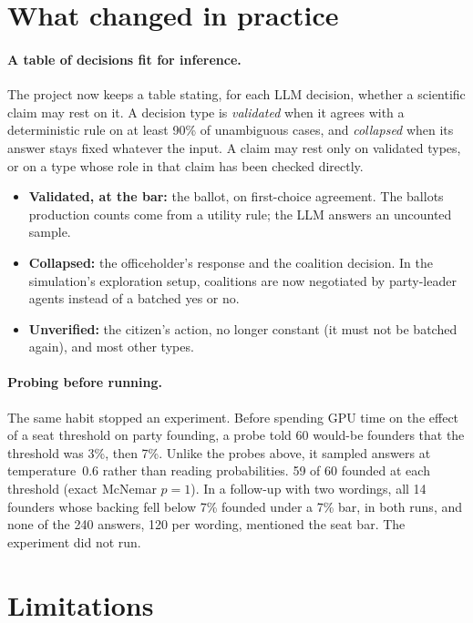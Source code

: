 \documentclass[11pt]{article}
\begin{document}
\section{What changed in practice}
\label{sec:practice}

\paragraph{A table of decisions fit for inference.} The project now keeps a table stating, for
each LLM decision, whether a scientific claim may rest on it. A decision type is
\emph{validated} when it agrees with a deterministic rule on at least 90\% of unambiguous cases,
and \emph{collapsed} when its answer stays fixed whatever the input. A claim may rest only on
validated types, or on a type whose role in that claim has been checked directly.
\begin{itemize}
  \item \textbf{Validated, at the bar:} the ballot, on first-choice agreement. The ballots
    production counts come from a utility rule; the LLM answers an uncounted sample.
  \item \textbf{Collapsed:} the officeholder's response and the coalition decision. In the
    simulation's exploration setup, coalitions are now negotiated by party-leader agents
    instead of a batched yes or no.
  \item \textbf{Unverified:} the citizen's action, no longer constant (it must not be batched
    again), and most other types.
\end{itemize}

\paragraph{Probing before running.} The same habit stopped an experiment. Before spending GPU
time on the effect of a seat threshold on party founding, a probe told 60 would-be
founders that the threshold was 3\%, then 7\%. Unlike the probes above, it sampled answers at
temperature~0.6 rather than reading probabilities. 59 of 60 founded at each threshold (exact
McNemar $p = 1$). In a follow-up with two wordings, all 14 founders whose backing fell below 7\%
founded under a 7\% bar, in both runs, and none of the 240 answers, 120 per wording, mentioned
the seat bar. The
experiment did not run.

\section{Limitations}
\label{sec:limits}
\end{document}
